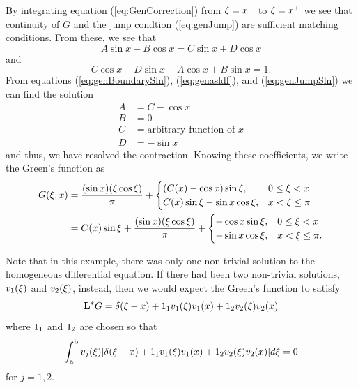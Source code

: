     By integrating equation (\ref{eq:GenCorrection}) from \(\xi = x^-\) to \(\xi = x^+\) we see that continuity of \(G\) and the jump condtion (\ref{eq:genJump}) are sufficient matching conditions. From these, we see that 
    \begin{equation}\label{eq:genasldf}
        A\sin x + B\cos x = C\sin x + D\cos x
    \end{equation}
    and 
    \begin{equation}\label{eq:genJumpSln}
        C\cos x - D\sin x -A \cos x + B\sin x = 1.
    \end{equation}
    From equations (\ref{eq:genBoundarySln}), (\ref{eq:genasldf}), and (\ref{eq:genJumpSln}) we can find the solution
    \begin{equation*}
        \begin{split}
            A &= C - \cos x\\
            B &= 0\\
            C &= \text{arbitrary function of } x\\
            D &= -\sin x
        \end{split}
    \end{equation*}
    and thus, we have resolved the contraction. Knowing these coefficients, we write the Green's function as
    \begin{equation*}
        \begin{split}
            G(\xi,x) &= \frac{(\sin x)(\xi\cos \xi)}{\pi} + \begin{cases}
                (C(x)-\cos x)\sin\xi, & 0\leq\xi < x\\
                C(x)\sin\xi -\sin x \cos\xi, & x < \xi \leq \pi
            \end{cases}\\
            &= C(x)\sin \xi + \frac{(\sin x)(\xi\cos \xi)}{\pi} + \begin{cases}
                -\cos x \sin\xi, & 0\leq\xi < x\\
                -\sin x \cos\xi, & x < \xi \leq \pi.
            \end{cases}
        \end{split}
    \end{equation*}

    Note that in this example, there was only one non-trivial solution to the homogeneous differential equation. If there had been two non-trivial solutions, \(v_1(\xi)\) and \(v_2(\xi)\), instead, then we would expect the Green's function to satisfy 
    \begin{equation*}
        \mathrm{\bf{L^*}} G = \delta(\xi-x) +1_1 v_1(\xi)v_1(x) + 1_2 v_2(\xi)v_2(x)
    \end{equation*}
    where \(1_1\) and \(1_2\) are chosen so that 
    \begin{equation*}
        \int_{\mathrm{a}}^{\mathrm{b}} v_j(\xi)[\delta(\xi-x) +1_1 v_1(\xi)v_1(x) + 1_2 v_2(\xi)v_2(x)]d\xi = 0
    \end{equation*} 
    for \(j=1,2\).

